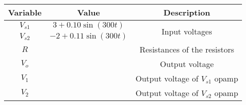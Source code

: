 \begin{tabular}{|c|c|c|}
  \hline
  \textbf{Variable} & \textbf{Value} & \textbf{Description} \\
  \hline
  $V_{s1}$ & $3 + 0.10 \sin(300t)$ & \multirow{2}{*}{Input voltages} \\
  \cline{1-2}
  $V_{s2}$ & $-2 + 0.11 \sin(300t)$ & \\
  \cline{1-3}
  $R$ & & Resistances of the resistors \\
  \cline{1-3}
  $V_o$ & & Output voltage \\
  \cline{1-3}
  $V_1$ & & Output voltage of $V_{s1}$ opamp \\
  \cline{1-3}
  $V_2$ & & Output voltage of $V_{s2}$ opamp \\
  \hline
\end{tabular}
